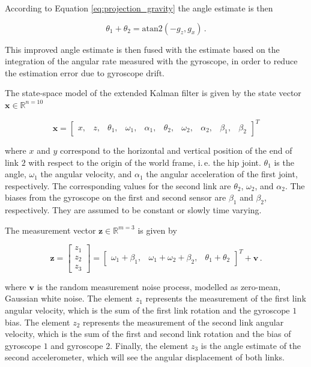 \noindent
According to Equation \ref{eq:projection_gravity} the angle estimate is then

\begin{equation}
  \theta_1 + \theta_2 = \mbox{atan}2(-g_z, g_x)\,.
\end{equation}

\noindent
This improved angle estimate is then fused with the estimate based on the integration of the angular rate measured with the gyroscope, in order to reduce the estimation error due to gyroscope drift.

 \label{sec:EKF_model}

The state-space model of the extended Kalman filter is given by the state vector $\mathbf{x} \in \mathbb{R}^{n=10}$

\begin{equation} \label{eq:state_vector}
  \mathbf{x} = \begin{bmatrix}
  	x, & z, & \theta_1, & \omega_1, & \alpha_1, & \theta_2, & \omega_2, & \alpha_2, & \beta_1, & \beta_2
  \end{bmatrix}^T
\end{equation}

\noindent
where $x$ and $y$ correspond to the horizontal and vertical position of the end of link $2$ with respect to the origin of the world frame, i.\,e. the hip joint. $\theta_1$ is the angle, $\omega_1$ the angular velocity, and $\alpha_1$ the angular acceleration of the first joint, respectively. The corresponding values for the second link are $\theta_2$, $\omega_2$, and $\alpha_2$. The biases from the gyroscope on the first and second sensor are $\beta_1$ and $\beta_2$, respectively. They are assumed to be constant or slowly time varying.

The measurement vector $\mathbf{z} \in \mathbb{R}^{m=3}$ is given by

\begin{equation} \label{eq:measurement_vector}
  \mathbf{z} = \begin{bmatrix} z_1 \\ z_2 \\ z_3 \end{bmatrix} = \begin{bmatrix}
  	\omega_1 + \beta_1, & \omega_1 + \omega_2 + \beta_2, & \theta_1 + \theta_2
  \end{bmatrix}^T + \mathbf{v}\,.
\end{equation}
 
\noindent
where $\mathbf{v}$ is the random measurement noise process, modelled as zero-mean, Gaussian white noise. The element $z_1$ represents the measurement of the first link angular velocity, which is the sum of the first link rotation and the gyroscope $1$ bias. The element $z_2$ represents the measurement of the second link angular velocity, which is the sum of the first and second link rotation and the bias of gyroscope $1$ and gyroscope $2$. Finally, the element $z_3$ is the angle estimate of the second accelerometer, which will see the angular displacement of both links.

